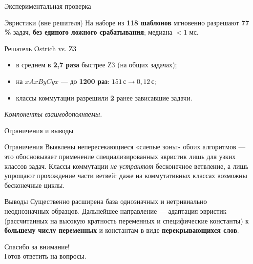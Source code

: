 \documentclass[aspectratio=169,11pt]{beamer}
\begin{document}
\begin{frame}{Экспериментальная проверка}
  \begin{block}{Эвристики (вне решателя)}
    На наборе из \textbf{118 шаблонов} мгновенно разрешают \textbf{77\,\%} задач,
    \textbf{без единого ложного срабатывания}; медиана $<1$ мс.
  \end{block}

  \begin{block}{Решатель Ostrich vs. Z3}
    \begin{itemize}\setlength{\itemsep}{6pt}
      \item в среднем в \textbf{2,7 раза} быстрее Z3 (на общих задачах);
      \item на $x A x B y C y x$ --- до \textbf{1200 раз}: $151\,\text{с}\to 0{,}12\,\text{с}$;
      \item классы коммутации разрешили \textbf{2} ранее зависавшие задачи.
    \end{itemize}
  \end{block}

  \smallskip
  \centering\small\emph{Компоненты взаимодополняемы.}
\end{frame}

\begin{frame}{Ограничения и выводы}
  \begin{alertblock}{Ограничения}
    \footnotesize
    Выявлены непересекающиеся «слепые зоны» обоих алгоритмов --- это обосновывает
    применение специализированных эвристик лишь для узких классов задач.
    Классы коммутации \emph{не устраняют} бесконечное ветвление, а лишь упрощают
    прохождение части ветвей: даже на коммутативных классах возможны бесконечные циклы.
  \end{alertblock}

  \begin{block}{Выводы}
    \footnotesize
    Существенно расширена база однозначных и нетривиально неоднозначных образцов.
    Дальнейшее направление --- адаптация эвристик (рассчитанных на высокую кратность
    переменных и специфические константы) к \textbf{большему числу переменных} и
    константам в виде \textbf{перекрывающихся слов}.
  \end{block}
\end{frame}

\begin{frame}[plain]
  \centering
  \vfill
  {\Large Спасибо за внимание!}\\[1em]
  {\normalsize Готов ответить на вопросы.}
  \vfill
\end{frame}
\end{document}
